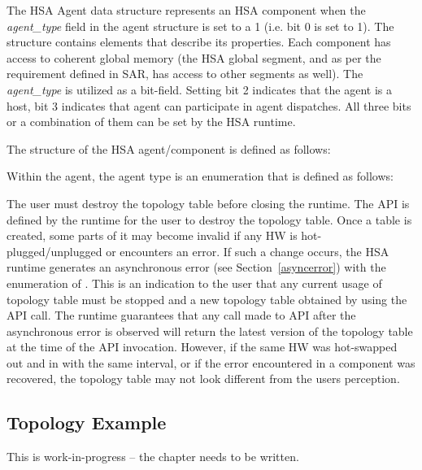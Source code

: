The HSA Agent data structure represents an HSA component when the
{\itshape agent\_type} field in the agent structure is set to a 1
(i.e. bit 0 is set to 1).
The structure contains elements that describe its properties. Each
component has access to coherent global memory (the HSA global
segment, and as per the requirement defined in SAR, has access to
other segments as well). The {\itshape agent\_type} is utilized as a
bit-field. Setting bit 2 indicates that the agent is a host, bit 3
indicates that agent can participate in agent dispatches. All
three bits or a combination of them can be set by the HSA runtime.

The structure of the HSA agent/component is defined as follows:


Within the agent, the agent type is an enumeration that is defined
as follows:


The user must destroy the topology table before closing the runtime.
The  API is defined by the
runtime for the user to destroy the topology table. Once a table is
created, some parts of it may become invalid if any HW is
hot-plugged/unplugged or encounters an error. If such a change
occurs, the HSA runtime generates an asynchronous error (see
Section~\ref{asyncerror}) with the  enumeration
of . This is an indication to the
user that any current usage of topology table must be stopped and a
new topology table obtained by using the
 API call. The runtime guarantees
that any call made to  API after
the asynchronous error is observed will return the latest version of
the topology table at the time of the API invocation. However, if
the same HW was hot-swapped out and in with the same interval, or if
the error encountered in a component was recovered, the topology
table may not look different from the users perception. 

\hypertarget{topology_example}{} \subsection{Topology Example}
This is {\color{red} work-in-progress} -- the chapter needs to be written.
